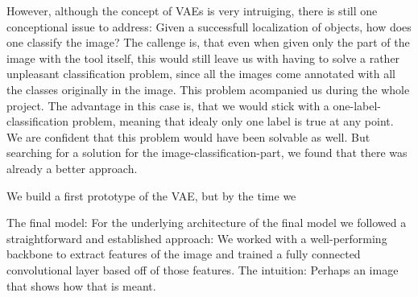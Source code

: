 However, although the concept of VAEs is very intruiging, there is still one conceptional issue to address: Given a successfull localization of objects, how does one classify the image?
The callenge is, that even when given only the part of the image with the tool itself, this would still leave us with having to solve a rather unpleasant classification problem, since all the images come annotated with all the classes originally in the image. This problem acompanied us during the whole project. The advantage in this case is, that we would stick with a one-label-classification problem, meaning that idealy only one label is true at any point. We are confident that this problem would have been solvable as well. But searching for a solution for the image-classification-part, we found that there was already a better approach.

We build a first prototype of the VAE, but by the time we 

The final model:
For the underlying architecture of the final model we followed a straightforward and established approach: We worked with a well-performing backbone to extract features of the image and trained a fully connected convolutional layer based off of those features. 
		The intuition: Perhaps an image that shows how that is meant.

